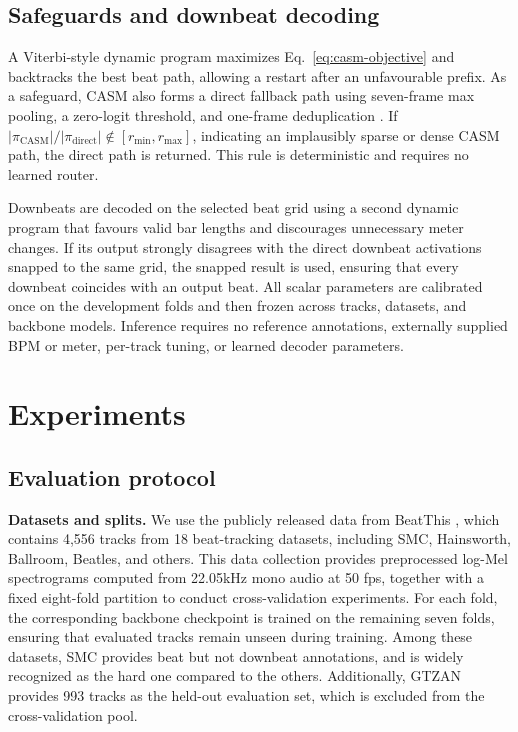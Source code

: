 \documentclass{article}
\begin{document}
\subsection{Safeguards and downbeat decoding}

A Viterbi-style dynamic program maximizes
Eq.~\eqref{eq:casm-objective} and backtracks the best beat path, allowing
a restart after an unfavourable prefix. As a safeguard, CASM also forms
a direct fallback path using seven-frame max pooling, a zero-logit
threshold, and one-frame deduplication
\cite{foscarin2024beat}. If
$\lvert\pi_{\mathrm{CASM}}\rvert/
 \lvert\pi_{\mathrm{direct}}\rvert
 \notin[r_{\min},r_{\max}]$,
indicating an implausibly sparse or dense CASM path, the direct path is returned. This rule is deterministic and requires no learned router.

Downbeats are decoded on the selected beat grid using a second
dynamic program that favours valid bar lengths and discourages
unnecessary meter changes. If its output strongly disagrees with the
direct downbeat activations snapped to the same grid, the snapped result is used, ensuring that every downbeat coincides with an output beat. All scalar parameters are calibrated once on the development folds and then frozen across tracks, datasets, and backbone models. Inference
requires no reference annotations, externally supplied BPM or meter,
per-track tuning, or learned decoder parameters.

\section{Experiments}\label{sec:exp}

\subsection{Evaluation protocol}
\textbf{Datasets and splits.} We use the publicly released data from BeatThis \cite{foscarin2024beat}, which contains 4,556 tracks from 18 beat-tracking datasets, including SMC, Hainsworth, Ballroom, Beatles, and others. This data collection provides preprocessed log-Mel spectrograms computed from 22.05kHz mono audio at 50 fps, together with a fixed eight-fold partition to conduct cross-validation experiments. For each fold, the corresponding backbone checkpoint is trained on the remaining seven folds, ensuring that evaluated tracks remain unseen during training. Among these datasets, SMC provides beat but not downbeat annotations, and is widely recognized as the hard one compared to the others. Additionally, GTZAN provides 993 tracks as the held-out evaluation set, which is excluded from the cross-validation pool.
\end{document}
